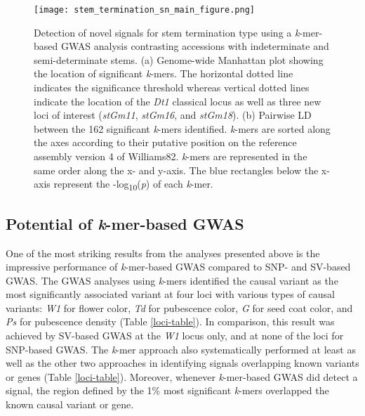 \begin{figure}
	\centering
	\texttt{[image: stem\_termination\_sn\_main\_figure.png]}
	\caption[Detection of novel signals for stem termination type
	using a \textit{k}-mer GWAS analysis contrasting accessions with
	indeterminate and semi-determinate stems]{Detection of novel signals for stem termination type
	using a \textit{k}-mer-based GWAS analysis contrasting accessions with
	indeterminate and semi-determinate stems.
	(a) Genome-wide Manhattan plot showing the location of significant \textit{k}-mers.
	The horizontal dotted line indicates the significance threshold
	whereas vertical dotted lines indicate the location of the \textit{Dt1}
	classical locus as well as three new loci of interest (\textit{stGm11},
	\textit{stGm16}, and \textit{stGm18}).
	(b) Pairwise LD between the 162 significant \textit{k}-mers identified.
	\textit{k}-mers are sorted along the axes according to their
	putative position on the reference assembly version 4 of Williams82.
	\textit{k}-mers are
	represented in the same order along the x- and y-axis. The blue
	rectangles below the x-axis represent the
	-log\textsubscript{10}(\textit{p}) of each \textit{k}-mer.}
	\label{stem-termination-main-figure}
\end{figure}

\subsection*{Potential of \emph{k}-mer-based GWAS}
\label{sv-gwas-potential-kmers}

One of the most striking results from the analyses presented above is the
impressive performance of \emph{k}-mer-based GWAS compared to SNP- and SV-based
GWAS. The GWAS analyses using \emph{k}-mers identified the causal variant as
the most significantly associated variant at four loci with various types of
causal variants: \emph{W1} for flower color, \emph{Td} for pubescence color,
\emph{G} for seed coat color, and \emph{Ps} for pubescence density (Table
\ref{loci-table}). In comparison, this result was achieved by SV-based GWAS at
the \textit{W1} locus only, and at none of the loci for SNP-based GWAS.
The \textit{k}-mer approach also systematically performed at least as well as
the other two approaches in identifying signals overlapping known variants or
genes (Table \ref{loci-table}). Moreover, whenever \textit{k}-mer-based GWAS
did detect a signal, the region defined by the 1\% most significant
\textit{k}-mers overlapped the known causal variant or gene. 

